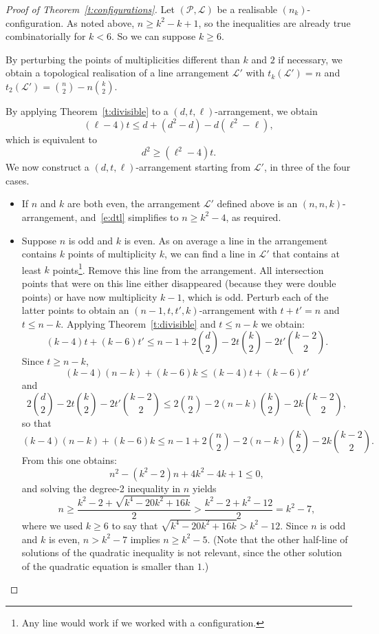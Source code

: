\documentclass[10pt,a4paper]{amsart}
\newcommand{\cP}{\mathcal{P}}
\renewcommand{\L}{\mathcal{L}}
\begin{document}
\begin{proof}[Proof of Theorem~\ref{t:configurations}]
Let $(\cP, \L)$ be a realisable $(n_k)$-configuration.
As noted above, $n \ge k^2-k+1$, so the inequalities are already true combinatorially for $k < 6$.
So we can suppose $k \ge 6$.

By perturbing the points of multiplicities different than $k$ and $2$ if necessary, we obtain a topological realisation of a line arrangement $\L'$ with $t_k(\L') = n$ and $t_2(\L') = {n \choose 2} - n {k \choose 2}$.

By applying Theorem~\ref{t:divisible} to a $(d,t,\ell)$-arrangement, we obtain
\[
(\ell-4)t \le d + (d^2-d) - d(\ell^2-\ell),
\]
which is equivalent to
\begin{equation}\label{e:dtl}
d^2 \ge (\ell^2-4)t.
\end{equation}
We now construct a $(d,t,\ell)$-arrangement starting from $\L'$, in three of the four cases.

\begin{itemize}
\item If $n$ and $k$ are both even, the arrangement $\L'$ defined above is an $(n,n,k)$-arrangement, and~\eqref{e:dtl} simplifies to $n\ge k^2-4$, as required.

\item Suppose $n$ is odd and $k$ is even.
As on average a line in the arrangement contains $k$ points of multiplicity $k$, we can find a line in $\L'$ that contains at least $k$ points\footnote{Any line would work if we worked with a configuration.}.
Remove this line from the arrangement. 
All intersection points that were on this line either disappeared (because they were double points) or have now multiplicity $k-1$, which is odd. 
Perturb each of the latter points to obtain an $(n-1,t,t',k)$-arrangement with $t + t' = n$ and $t \le n-k$.
Applying Theorem~\ref{t:divisible} and $t \le n-k$ we obtain:
\[
(k-4)t + (k-6)t' \le n-1 + 2{d \choose 2} - 2t{k \choose 2} - 2t'{k-2 \choose 2}.
\]
Since $t \ge n-k$,
\[
(k-4)(n-k) + (k-6)k \le (k-4)t + (k-6)t'
\]
and
\[
2{d \choose 2} - 2t{k \choose 2} - 2t'{k-2 \choose 2} \le 2{n \choose 2} - 2(n-k){k \choose 2} - 2k{k-2 \choose 2},
\]
so that
\[
(k-4)(n-k) + (k-6)k \le n-1 + 2{n \choose 2} - 2(n-k){k \choose 2} - 2k{k-2 \choose 2}.
\]
From this one obtains:
\[
n^2 - (k^2-2)n + 4k^2-4k+1 \le 0,
\]
and solving the degree-2 inequality in $n$ yields
\[
n \ge \frac{k^2-2 + \sqrt{k^4-20k^2 + 16k}}2 > \frac{k^2-2 + k^2-12}2 = k^2-7,
\]
where we used $k \ge 6$ to say that $\sqrt{k^4-20k^2 + 16k} > k^2-12$.
Since $n$ is odd and $k$ is even, $n > k^2-7$ implies $n \ge k^2-5$.
(Note that the other half-line of solutions of the quadratic inequality is not relevant, since the other solution of the quadratic equation is smaller than $1$.)


\end{itemize}
\end{proof}
\end{document}
